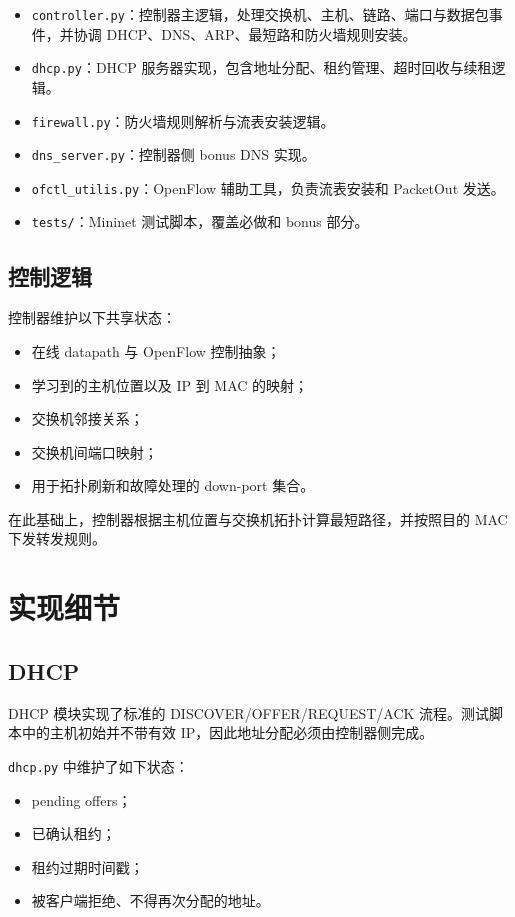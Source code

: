 \documentclass[11pt,a4paper]{ctexart}
\begin{document}
\begin{itemize}[leftmargin=1.5em]
    \item \texttt{controller.py}：控制器主逻辑，处理交换机、主机、链路、端口与数据包事件，并协调 DHCP、DNS、ARP、最短路和防火墙规则安装。
    \item \texttt{dhcp.py}：DHCP 服务器实现，包含地址分配、租约管理、超时回收与续租逻辑。
    \item \texttt{firewall.py}：防火墙规则解析与流表安装逻辑。
    \item \texttt{dns\_server.py}：控制器侧 bonus DNS 实现。
    \item \texttt{ofctl\_utilis.py}：OpenFlow 辅助工具，负责流表安装和 PacketOut 发送。
    \item \texttt{tests/}：Mininet 测试脚本，覆盖必做和 bonus 部分。
\end{itemize}

\subsection{控制逻辑}

控制器维护以下共享状态：

\begin{itemize}[leftmargin=1.5em]
    \item 在线 datapath 与 OpenFlow 控制抽象；
    \item 学习到的主机位置以及 IP 到 MAC 的映射；
    \item 交换机邻接关系；
    \item 交换机间端口映射；
    \item 用于拓扑刷新和故障处理的 down-port 集合。
\end{itemize}

在此基础上，控制器根据主机位置与交换机拓扑计算最短路径，并按照目的 MAC 下发转发规则。

\section{实现细节}

\subsection{DHCP}

DHCP 模块实现了标准的 DISCOVER/OFFER/REQUEST/ACK 流程。测试脚本中的主机初始并不带有效 IP，因此地址分配必须由控制器侧完成。

\texttt{dhcp.py} 中维护了如下状态：

\begin{itemize}[leftmargin=1.5em]
    \item pending offers；
    \item 已确认租约；
    \item 租约过期时间戳；
    \item 被客户端拒绝、不得再次分配的地址。
\end{itemize}
\end{document}
